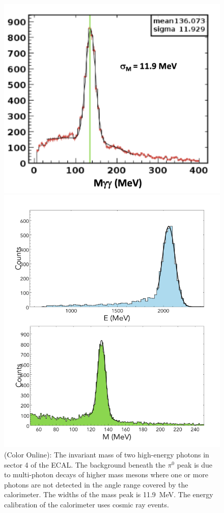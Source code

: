 \documentclass[final,3p,twocolumn]{elsarticle}
\begin{document}
\begin{figure}[htbp!]
\centerline{\includegraphics[width=0.95\columnwidth]{ECAL-2g-mass-fit.png}}
\caption{(Color Online): The invariant mass of two high-energy photons in sector 4 of the ECAL. The background beneath
the $\pi^0$ peak is due to multi-photon decays of higher mass mesons where one or more photons are not detected
in the angle range covered by the calorimeter. The widths of the mass peak is 11.9~MeV. The energy calibration of the calorimeter 
uses cosmic ray events. }
\centerline{\includegraphics[width=1.15\columnwidth]{FT-performance.png}}

\end{figure}
\end{document}
